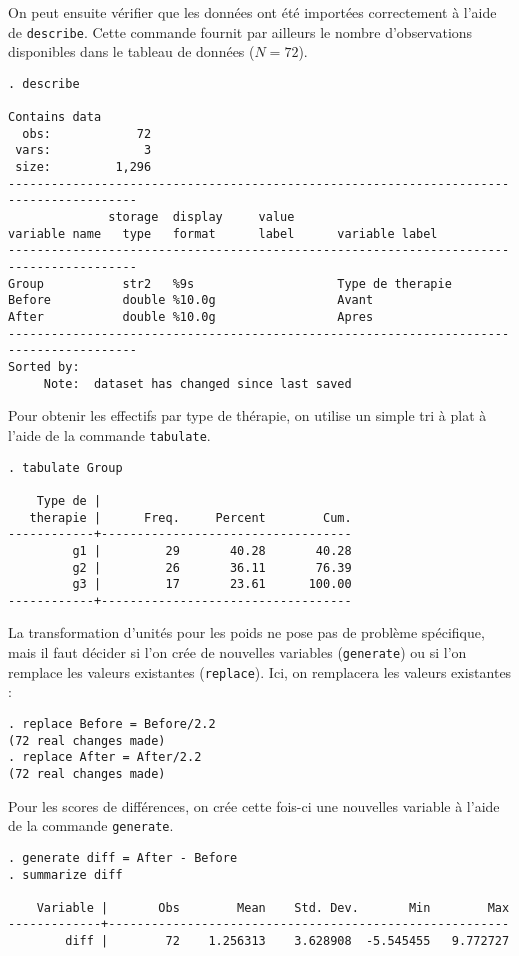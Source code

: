 On peut ensuite vérifier que les données ont été importées correctement à
l'aide de \texttt{describe}. Cette commande fournit par ailleurs le nombre
d'observations disponibles dans le tableau de données ($N=72$).
\begin{verbatim}
. describe

Contains data
  obs:            72                          
 vars:             3                          
 size:         1,296                          
----------------------------------------------------------------------------------------
              storage  display     value
variable name   type   format      label      variable label
----------------------------------------------------------------------------------------
Group           str2   %9s                    Type de therapie
Before          double %10.0g                 Avant
After           double %10.0g                 Apres
----------------------------------------------------------------------------------------
Sorted by:  
     Note:  dataset has changed since last saved
\end{verbatim}

Pour obtenir les effectifs par type de thérapie, on utilise un simple tri à
plat à l'aide de la commande \texttt{tabulate}.
\begin{verbatim}
. tabulate Group

    Type de |
   therapie |      Freq.     Percent        Cum.
------------+-----------------------------------
         g1 |         29       40.28       40.28
         g2 |         26       36.11       76.39
         g3 |         17       23.61      100.00
------------+-----------------------------------
\end{verbatim}

La transformation d'unités pour les poids ne pose pas de problème
spécifique, mais il faut décider si l'on crée de nouvelles variables
(\texttt{generate}) ou si l'on remplace les valeurs existantes
(\texttt{replace}). Ici, on remplacera les valeurs existantes :
\begin{verbatim}
. replace Before = Before/2.2
(72 real changes made)
. replace After = After/2.2
(72 real changes made)
\end{verbatim}

Pour les scores de différences, on crée cette fois-ci une nouvelles variable
à l'aide de la commande \texttt{generate}.
\begin{verbatim}
. generate diff = After - Before
. summarize diff

    Variable |       Obs        Mean    Std. Dev.       Min        Max
-------------+--------------------------------------------------------
        diff |        72    1.256313    3.628908  -5.545455   9.772727
\end{verbatim}

